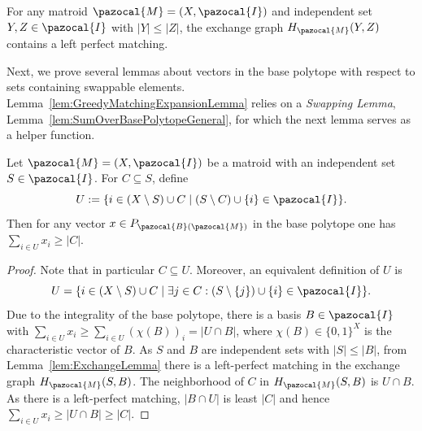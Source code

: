 \begin{lemma}\label{lem:ExchangeLemma}
For any matroid $\pazocal{M} = (X,\pazocal{I})$ and independent set $Y,Z \in \pazocal{I}$ with $|Y| \leq |Z|$,
the exchange graph $H_{\pazocal{M}}(Y,Z)$ contains a left perfect matching.
\end{lemma}



Next, we prove several lemmas about vectors in the base polytope with respect to sets containing swappable elements.
Lemma~\ref{lem:GreedyMatchingExpansionLemma} relies on a \textit{Swapping Lemma}, 
Lemma~\ref{lem:SumOverBasePolytopeGeneral}, for which the next lemma serves as a helper function.
\begin{lemma} \label{lem:SumOverBasePolytope}
Let $\pazocal{M} = (X,\pazocal{I})$ be a matroid with an independent set $S \in \pazocal{I}$.
For $C \subseteq S$, define 
\[
    U := \{ i \in (X \setminus S) \cup C \mid (S \setminus C) \cup \{i\} \in \pazocal{I}\}.
\]
Then for any vector $x \in P_{\pazocal{B}(\pazocal{M})}$ in the base polytope one has $\sum_{i \in U} x_i \geq |C|$.
\end{lemma}
\begin{proof}
Note that in particular $C \subseteq U$. Moreover, an equivalent definition of $U$ is 
\[
    U = \{ i \in (X \setminus S) \cup C \mid \exists j \in C: (S \setminus \{j\}) \cup \{ i\} \in \pazocal{I}\}.
\]
Due to the integrality of the base polytope, there is a basis $B \in \pazocal{I}$ 
with $\sum_{i \in U} x_i \geq \sum_{i \in U} (\chi(B))_i = |U \cap B|$, 
where $\chi(B) \in \{ 0,1\}^X$ is the characteristic vector of $B$. 
As $S$ and $B$ are independent sets with $|S| \leq |B|$, 
from Lemma~\ref{lem:ExchangeLemma} there is a left-perfect matching in the exchange graph $H_{\pazocal{M}} (S,B)$. 
The neighborhood of $C$ in $H_{\pazocal{M}} (S,B)$ is  $U \cap B$.
As there is a left-perfect matching, $|B \cap U|$ is least $|C|$ and hence $\sum_{i \in U} x_i \geq |U \cap B| \geq |C|$.
\end{proof}


